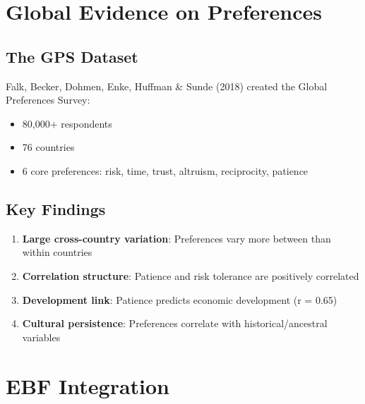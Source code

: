 \section{Global Evidence on Preferences}

\subsection{The GPS Dataset}

Falk, Becker, Dohmen, Enke, Huffman \& Sunde (2018) created the Global Preferences Survey:

\begin{itemize}
    \item 80,000+ respondents
    \item 76 countries
    \item 6 core preferences: risk, time, trust, altruism, reciprocity, patience
\end{itemize}

\subsection{Key Findings}

\begin{tcolorbox}[colback=green!5!white, colframe=green!75!black, title=GPS Key Results]
\begin{enumerate}
    \item \textbf{Large cross-country variation}: Preferences vary more between than within countries
    \item \textbf{Correlation structure}: Patience and risk tolerance are positively correlated
    \item \textbf{Development link}: Patience predicts economic development (r = 0.65)
    \item \textbf{Cultural persistence}: Preferences correlate with historical/ancestral variables
\end{enumerate}
\end{tcolorbox}

\section{EBF Integration}

